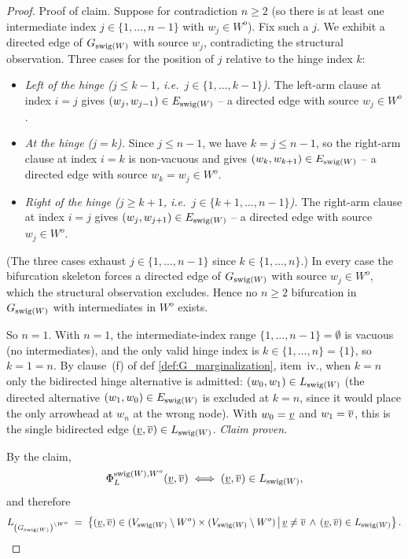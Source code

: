 \documentclass[main]{subfiles}
\begin{document}
\begin{proof}
\noindent Proof of claim. Suppose for contradiction $n \ge 2$ (so there is at least one intermediate index $j \in \{1, \ldots, n-1\}$ with $w_j \in W^o$). Fix such a $j$. We exhibit a directed edge of $G_{\mathrm{swig}(W)}$ with source $w_j$, contradicting the structural observation. Three cases for the position of $j$ relative to the hinge index $k$:
\begin{itemize}
    \item \emph{Left of the hinge ($j \le k - 1$, i.e.\ $j \in \{1, \ldots, k-1\}$).} The left-arm clause at index $i = j$ gives $(w_j, w_{j-1}) \in E_{\mathrm{swig}(W)}$ -- a directed edge with source $w_j \in W^o$.
    \item \emph{At the hinge ($j = k$).} Since $j \le n - 1$, we have $k = j \le n - 1$, so the right-arm clause at index $i = k$ is non-vacuous and gives $(w_k, w_{k+1}) \in E_{\mathrm{swig}(W)}$ -- a directed edge with source $w_k = w_j \in W^o$.
    \item \emph{Right of the hinge ($j \ge k + 1$, i.e.\ $j \in \{k+1, \ldots, n-1\}$).} The right-arm clause at index $i = j$ gives $(w_j, w_{j+1}) \in E_{\mathrm{swig}(W)}$ -- a directed edge with source $w_j \in W^o$.
\end{itemize}
(The three cases exhaust $j \in \{1, \ldots, n-1\}$ since $k \in \{1, \ldots, n\}$.) In every case the bifurcation skeleton forces a directed edge of $G_{\mathrm{swig}(W)}$ with source $w_j \in W^o$, which the structural observation excludes. Hence no $n \ge 2$ bifurcation in $G_{\mathrm{swig}(W)}$ with intermediates in $W^o$ exists.

So $n = 1$. With $n = 1$, the intermediate-index range $\{1, \ldots, n-1\} = \emptyset$ is vacuous (no intermediates), and the only valid hinge index is $k \in \{1, \ldots, n\} = \{1\}$, so $k = 1 = n$. By clause~(f) of def \ref{def:G_marginalization}, item~iv., when $k = n$ only the bidirected hinge alternative is admitted: $(w_0, w_1) \in L_{\mathrm{swig}(W)}$ (the directed alternative $(w_1, w_0) \in E_{\mathrm{swig}(W)}$ is excluded at $k = n$, since it would place the only arrowhead at $w_n$ at the wrong node). With $w_0 = \underline{v}$ and $w_1 = \overline{v}$, this is the single bidirected edge $(\underline{v}, \overline{v}) \in L_{\mathrm{swig}(W)}$. \emph{Claim proven.}

By the claim,
\[
    \Phi_L^{\mathrm{swig}(W), W^o}(\underline{v}, \overline{v}) \;\Longleftrightarrow\; (\underline{v}, \overline{v}) \in L_{\mathrm{swig}(W)},
\]
and therefore
\[
    L_{\left ( G_{\mathrm{swig}(W)} \right )^{\setminus W^o}} \;=\; \left \{ (\underline{v}, \overline{v}) \in (V_{\mathrm{swig}(W)} \setminus W^o) \times (V_{\mathrm{swig}(W)} \setminus W^o) \,\middle|\, \underline{v} \neq \overline{v} \,\wedge\, (\underline{v}, \overline{v}) \in L_{\mathrm{swig}(W)} \right \}.
\]


\end{proof}
\end{document}
